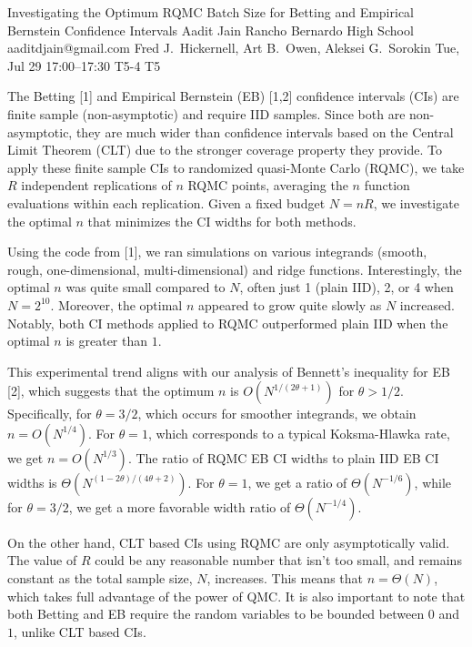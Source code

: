 \begin{talk}
  {Investigating the Optimum RQMC Batch Size for Betting and Empirical Bernstein Confidence Intervals}%
  {Aadit Jain}%
  {Rancho Bernardo High School}%
  {aaditdjain@gmail.com}%
  {Fred J.\ Hickernell, Art B.\ Owen, Aleksei G.\ Sorokin}%
  {}%
  {Tue, Jul 29 17:00--17:30}%
  {T5-4}%
  {T5}%
  
    
   

The Betting [1] and Empirical Bernstein (EB) [1,2] confidence intervals (CIs) are finite sample (non-asymptotic) and require IID samples. Since both are non-asymptotic, they are much wider than confidence intervals based on the Central Limit Theorem (CLT) due to the stronger coverage property they provide. To apply these finite sample CIs to randomized quasi-Monte Carlo (RQMC), we take $R$ independent replications of $n$ RQMC points, averaging the $n$ function evaluations within each replication. Given a fixed budget $N = nR$, we investigate the optimal $n$ that minimizes the CI widths for both methods.  

Using the code from [1], we ran simulations on various integrands (smooth, rough, one-dimensional, multi-dimensional) and ridge functions. Interestingly, the optimal $n$ was quite small compared to $N$, often just 1 (plain IID), 2, or 4 when $N = 2^{10}$. Moreover, the optimal $n$ appeared to grow quite slowly as $N$ increased. Notably, both CI methods applied to RQMC outperformed plain IID when the optimal $n$ is greater than $1$.  

This experimental trend aligns with our analysis of Bennett’s inequality for EB [2], which suggests that the optimum $n$ is $O(N^{1/(2\theta + 1)})$ for $\theta > 1/2$. 
Specifically, for $\theta = 3/2$, which occurs for smoother integrands, we obtain $n = O(N^{1/4})$. For $\theta = 1$, which corresponds to a typical Koksma-Hlawka rate, we get $n = O(N^{1/3})$. The ratio of RQMC EB CI widths to plain IID EB CI widths is $\Theta( N^{(1-2\theta)/(4\theta+2)})$. For $\theta=1$,
we get a ratio of $\Theta(N^{-1/6})$,
while for $\theta=3/2$,
we get a more favorable width ratio of $\Theta(N^{-1/4})$. 


On the other hand, CLT based CIs using RQMC  are only asymptotically valid. The value of $R$ could be any reasonable number that isn't too small, and remains constant as the total sample size, $N$, increases.  This means that $n = \Theta(N)$, which takes full advantage of the power of QMC.  It is also important to note that both Betting and EB require the random variables to be bounded between $0$ and $1$, unlike CLT based CIs. 



\end{talk}
